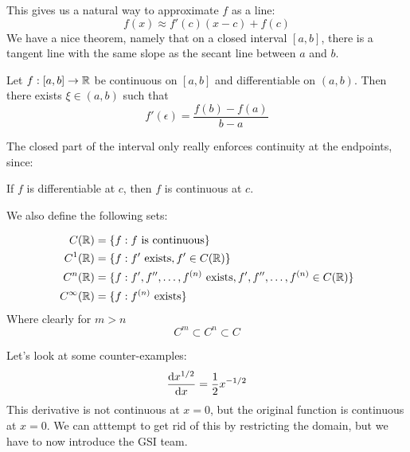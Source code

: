 This gives us a natural way to approximate $f$ as a line:
\[ f(x) \approx f'(c) (x - c) + f(c) \]
We have a nice theorem, namely that on a closed interval $[a, b]$, there is a tangent line with the same slope as the secant line between $a$
and $b$.
\begin{theorem}
    Let $f: [a, b] \to \operatorname{\mathbb{R}}$ be continuous on $[a, b]$ and differentiable on $(a, b)$. Then there exists $\xi \in (a, b)$ such that
    \[ f'(\epsilon) = \frac{f(b) - f(a)}{b - a} \]
\end{theorem}
The closed part of the interval only really enforces continuity at the endpoints, since:
\begin{theorem}
    If $f$ is differentiable at $c$, then $f$ is continuous at $c$.
\end{theorem}
We also define the following sets:
\begin{definition}
    \begin{align*}
        C(\operatorname{\mathbb{R}}) &= \{ f: f \text{ is continuous} \} \\
        C^1(\operatorname{\mathbb{R}}) &= \{ f: f' \text{ exists}, f' \in C(\operatorname{\mathbb{R}}) \}\\
        C^n(\operatorname{\mathbb{R}}) &= \{ f: f', f'', \dots, f^{(n)} \text{ exists}, f', f'', \dots, f^{(n)} \in C(\operatorname{\mathbb{R}}) \}\\
        C^{\infty}(\operatorname{\mathbb{R}}) &= \{ f: f^{(n)} \text{ exists} \}\\
    \end{align*}
    Where clearly for $m > n$
    \[ C^m \subset C^n \subset C \]
\end{definition}
Let's look at some counter-examples:
\[ \derivative{x^{1/2}}{x} = \frac{1}{2} x^{-1/2} \]
This derivative is not continuous at $x = 0$, but the original function is continuous at $x = 0$. We can atttempt to get rid of this by restricting the domain,
but we have to now introduce the GSI team.